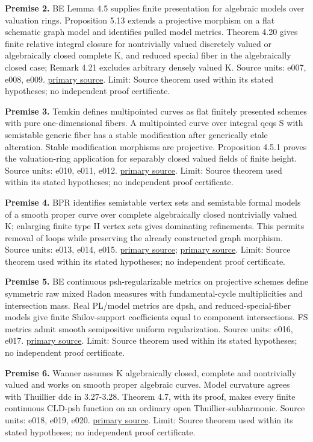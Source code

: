\documentclass[
  10pt,
]{article}
\begin{document}
\textbf{Premise 2.} BE Lemma 4.5 supplies finite presentation for
algebraic models over valuation rings. Proposition 5.13 extends a
projective morphism on a flat schematic graph model and identifies
pulled model metrics. Theorem 4.20 gives finite relative integral
closure for nontrivially valued discretely valued or algebraically
closed complete K, and reduced special fiber in the algebraically closed
case; Remark 4.21 excludes arbitrary densely valued K. Source units:
e007, e008, e009. \href{https://arxiv.org/pdf/1805.01016v3}{primary
source}. Limit: Source theorem used within its stated hypotheses; no
independent proof certificate.

\textbf{Premise 3.} Temkin defines multipointed curves as flat finitely
presented schemes with pure one-dimensional fibers. A multipointed curve
over integral qcqs S with semistable generic fiber has a stable
modification after generically etale alteration. Stable modification
morphisms are projective. Proposition 4.5.1 proves the valuation-ring
application for separably closed valued fields of finite height. Source
units: e010, e011, e012.
\href{https://arxiv.org/pdf/0707.3953v3}{primary source}. Limit: Source
theorem used within its stated hypotheses; no independent proof
certificate.

\textbf{Premise 4.} BPR identifies semistable vertex sets and semistable
formal models of a smooth proper curve over complete algebraically
closed nontrivially valued K; enlarging finite type II vertex sets gives
dominating refinements. This permits removal of loops while preserving
the already constructed graph morphism. Source units: e013, e014, e015.
\href{https://arxiv.org/pdf/1404.0279v1}{primary source};
\href{https://arxiv.org/pdf/1404.0279}{primary source}. Limit: Source
theorem used within its stated hypotheses; no independent proof
certificate.

\textbf{Premise 5.} BE continuous psh-regularizable metrics on
projective schemes define symmetric raw mixed Radon measures with
fundamental-cycle multiplicities and intersection mass. Real PL/model
metrics are dpsh, and reduced-special-fiber models give finite
Shilov-support coefficients equal to component intersections. FS metrics
admit smooth semipositive uniform regularization. Source units: e016,
e017. \href{https://arxiv.org/pdf/1805.01016v3}{primary source}. Limit:
Source theorem used within its stated hypotheses; no independent proof
certificate.

\textbf{Premise 6.} Wanner assumes K algebraically closed, complete and
nontrivially valued and works on smooth proper algebraic curves. Model
curvature agrees with Thuillier ddc in 3.27-3.28. Theorem 4.7, with its
proof, makes every finite continuous CLD-psh function on an ordinary
open Thuillier-subharmonic. Source units: e018, e019, e020.
\href{https://arxiv.org/pdf/1801.04713v3}{primary source}. Limit: Source
theorem used within its stated hypotheses; no independent proof
certificate.
\end{document}
